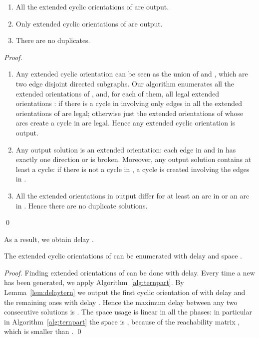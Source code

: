 \documentclass{llncs}
\begin{document}
\begin{lemma}[Correctness]
\begin{enumerate}
\item All the extended cyclic orientations of  are output. 
\item Only extended cyclic orientations of  are output.
\item There are no duplicates.
\end{enumerate}
\end{lemma}
\begin{proof}
\begin{enumerate}
\item Any extended cyclic orientation  can be seen as the union  of  and , which are two edge disjoint directed subgraphs. Our algorithm enumerates all the extended orientations of , and, for each of them, all legal extended orientations : if there is a cycle in  involving only edges in  all the extended orientations of  are legal; otherwise just the extended orientations  of  whose arcs create a cycle in  are legal. Hence any extended cyclic orientation  is output.
\item Any output solution is an extended orientation: each edge in  and in  has exactly one direction or is broken. Moreover, any output solution contains at least a cycle: if there is not a cycle in , a cycle is created involving the edges in .
\item All the extended orientations  in output differ for at least an arc in  or an arc in . Hence there are no duplicate solutions.
\end{enumerate}
\qed
\end{proof}

As a result, we obtain delay .
\begin{lemma}
The extended cyclic orientations of  can be enumerated with delay  and space .
\label{lem:delay2}
\end{lemma}
\begin{proof}
Finding extended orientations  of  can be done with  delay. Every time a new  has been generated, we apply Algorithm~\ref{alg:ternpart}. By Lemma~\ref{lem:delaytern} we output the first cyclic orientation  of  with delay  and the remaining ones with delay . Hence the maximum delay between any two consecutive solutions is . The space usage is linear in all the phases: in particular in Algorithm~\ref{alg:ternpart} the space is , because of the reachability matrix , which is smaller than .
\qed
\end{proof}
\end{document}

